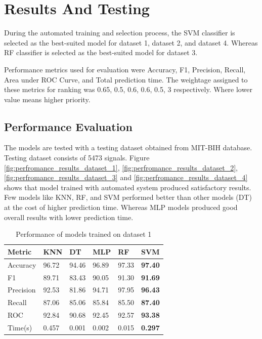 \section{Results And Testing} \label{sec:results_and_testing}
During the automated training and selection process, the SVM classifier is selected as the best-suited model for dataset 1, dataset 2, and dataset 4. Whereas RF classifier is selected as the best-suited model for dataset 3. 

Performance metrics used for evaluation were Accuracy, F1, Precision, Recall, Area under ROC Curve, and Total prediction time. The weightage assigned to these metrics for ranking was 0.65, 0.5, 0.6, 0.6, 0.5, 3 respectively. Where lower value means higher priority.

\subsection{Performance Evaluation} \label{subsec:performance_evaluation}
The models are tested with a testing dataset obtained from MIT-BIH database. Testing dataset consists of 5473 signals. Figure \ref{fig:perfromance_results_dataset_1}, \ref{fig:perfromance_results_dataset_2}, \ref{fig:perfromance_results_dataset_3} and \ref{fig:perfromance_results_dataset_4} shows that model trained with automated system produced satisfactory results. Few models like KNN, RF, and SVM performed better than other models (DT) at the cost of higher prediction time. Whereas MLP models produced good overall results with lower prediction time.

\begin{table}[hbt]
\caption{Performance of models trained on dataset 1} \label{tab:performance_of_models_trained_on_dataset_1}
\begin{tabular*}{\tblwidth}{@{}LLLLLL@{}}
    \toprule
    Metric & KNN & DT & MLP & RF & \textbf{SVM} \\
    \midrule
    Accuracy & 96.72 & 94.46 & 96.89 & 97.33 & \textbf{97.40} \\
    F1 & 89.71 & 83.43 & 90.05 & 91.30 & \textbf{91.69} \\
    Precision & 92.53 & 81.86 & 94.71 & 97.95 & \textbf{96.43} \\
    Recall & 87.06 & 85.06 & 85.84 & 85.50 & \textbf{87.40} \\
    ROC & 92.84 & 90.68 & 92.45 & 92.57 & \textbf{93.38} \\
    Time(s) & 0.457 & 0.001 & 0.002 & 0.015 & \textbf{0.297} \\
    \bottomrule
\end{tabular*}
\end{table}

